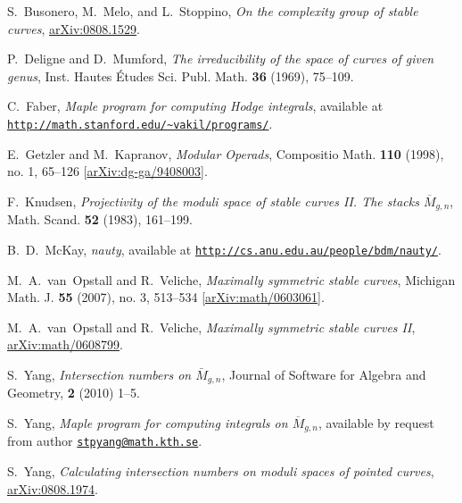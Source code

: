 \documentclass{amsart}
\newcommand{\arXiv}[1]{\href{http://arxiv.org/abs/#1}{arXiv:#1}}
\theoremstyle{plain}
\theoremstyle{definition}
\begin{document}
\begin{thebibliography}{2}

  S.~Busonero, M.~Melo, and L.~Stoppino,
  \emph{On the complexity group of stable curves},
  \arXiv{0808.1529}.%

  P.~Deligne and D.~Mumford,
  \emph{The irreducibility of the space of curves of given genus},
  Inst. Hautes \'Etudes Sci. Publ. Math. \textbf{36} (1969), 75--109.

  C.~Faber,
  \emph{Maple program for computing Hodge integrals},
  available at \href{http://math.stanford.edu/~vakil/programs/}
  {\texttt{http://math.stanford.edu/\~{}vakil/programs/}}.

  E.~Getzler and M.~Kapranov,
  \emph{Modular Operads},
  Compositio Math. \textbf{110} (1998), no. 1, 65--126
  [\arXiv{dg-ga/9408003}].

   F.~Knudsen,
  \emph{Projectivity of the moduli space of stable curves II. The stacks $\overline{M}_{g,n}$}, Math. Scand. \textbf{52} (1983), 161--199.

  B.~D.~McKay,
  \emph{nauty},
  available at \href{http://cs.anu.edu.au/people/bdm/nauty/}
  {\texttt{http://cs.anu.edu.au/people/bdm/nauty/}}.

  M.~A.~van~Opstall and R.~Veliche,
  \emph{Maximally symmetric stable curves},
  Michigan Math. J. \textbf{55} (2007), no. 3, 513--534
  [\arXiv{math/0603061}].

  M.~A.~van~Opstall and R.~Veliche,
  \emph{Maximally symmetric stable curves II},
  \arXiv{math/0608799}.%

  S.~Yang,
  \emph{Intersection numbers on $\bar{M}_{g,n}$},
  Journal of Software for Algebra and Geometry, {\bf 2} (2010) 1--5.

  S.~Yang,
  \emph{Maple program for computing integrals on $\overline{M}_{g,n}$},
  available by request from author \href{mailto:stpyang@math.kth.se}
  {\texttt{stpyang@math.kth.se}}.

  S.~Yang,
  \emph{Calculating intersection numbers on moduli spaces of pointed curves},
  \arXiv{0808.1974}.%

\end{thebibliography}
\end{document}
